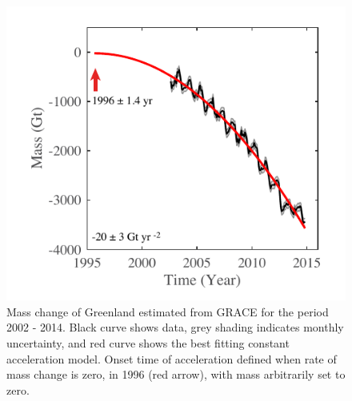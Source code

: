 \clearpage
\begin{figure}
	\centering
	\includegraphics{figs_chpt4/Fig2.pdf}	
	\caption[Mass change of Greenland estimated from GRACE for the period 2002 - 2014.]{Mass change of Greenland estimated from GRACE for the period 2002 - 2014.  Black curve shows data, grey shading indicates monthly uncertainty, and red curve shows the best fitting constant acceleration model.  Onset time of acceleration defined when rate of mass change is zero, in 1996 (red arrow), with mass arbitrarily set to zero.}
	\label{fig:chpt4_fig2}
\end{figure}

